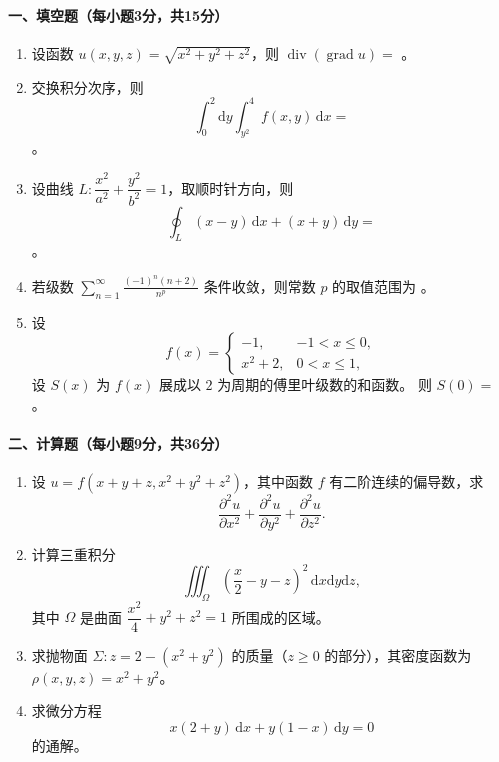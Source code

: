 \paragraph*{一、填空题（每小题3分，共15分）}
\begin{enumerate}
  \item 设函数 \(u(x,y,z)=\sqrt{x^2+y^2+z^2}\)，则 \(\operatorname{div}(\operatorname{grad}u)=\) \underline{\hspace{5cm}}。
  \item 交换积分次序，则
  \[
    \int_0^2\mathrm{d}y\int_{y^2}^{4}f(x,y)\,\mathrm{d}x=
  \]
  \underline{\hspace{5cm}}。
  \item 设曲线 \(L:\dfrac{x^2}{a^2}+\dfrac{y^2}{b^2}=1\)，取顺时针方向，则
  \[
    \oint_L(x-y)\,\mathrm{d}x+(x+y)\,\mathrm{d}y=
  \]
  \underline{\hspace{5cm}}。
  \item 若级数 \(\displaystyle \sum_{n=1}^{\infty}\frac{(-1)^n(n+2)}{n^p}\) 条件收敛，则常数 \(p\) 的取值范围为 \underline{\hspace{5cm}}。
  \item 设
  \[
    f(x)=
    \begin{cases}
      -1, & -1<x\le0,\\
      x^2+2, & 0<x\le1,
    \end{cases}
  \]
  设 \(S(x)\) 为 \(f(x)\) 展成以 \(2\) 为周期的傅里叶级数的和函数。
  则 \(S(0)=\) \underline{\hspace{5cm}}。
\end{enumerate}

\paragraph*{二、计算题（每小题9分，共36分）}
\begin{enumerate}
  \item 设 \(u=f(x+y+z,x^2+y^2+z^2)\)，其中函数 \(f\) 有二阶连续的偏导数，求
  \[
    \frac{\partial^2u}{\partial x^2}+
    \frac{\partial^2u}{\partial y^2}+
    \frac{\partial^2u}{\partial z^2}.
  \]

  \item 计算三重积分
  \[
    \iiint_\Omega\left(\frac x2-y-z\right)^2\,\mathrm{d}x\mathrm{d}y\mathrm{d}z,
  \]
  其中 \(\Omega\) 是曲面 \(\dfrac{x^2}{4}+y^2+z^2=1\) 所围成的区域。

  \item 求抛物面 \(\Sigma:z=2-(x^2+y^2)\) 的质量（\(z\ge0\) 的部分），其密度函数为
  \(\rho(x,y,z)=x^2+y^2\)。

  \item 求微分方程
  \[
    x(2+y)\,\mathrm{d}x+y(1-x)\,\mathrm{d}y=0
  \]
  的通解。
\end{enumerate}

